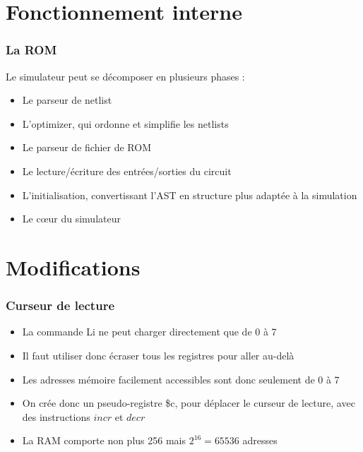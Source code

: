 \documentclass{beamer}
\begin{document}
\section{Fonctionnement interne}

\begin{frame}
\frametitle{La ROM}
Le simulateur peut se décomposer en plusieurs phases :
\begin{itemize}
	\item Le parseur de netlist
	\item L'optimizer, qui ordonne et simplifie les netlists
	\item Le parseur de fichier de ROM
	\item Le lecture/écriture des entrées/sorties du circuit
	\item L'initialisation, convertissant l'AST en structure plus adaptée à la simulation
	\item Le cœur du simulateur
\end{itemize}
\end{frame}



\section{Modifications}


\begin{frame}
\frametitle{Curseur de lecture}
\begin{itemize}
	\item La commande Li ne peut charger directement que de 0 à 7
	\item Il faut utiliser donc écraser tous les registres pour aller au-delà
	\item Les adresses mémoire facilement accessibles sont donc seulement de 0 à 7
	\item On crée donc un pseudo-registre \$c, pour déplacer le curseur de lecture, avec des instructions $incr$ et $decr$
	\item La RAM comporte non plus 256 mais $2^{16} = 65536$ adresses
\end{itemize}
\end{frame}
\end{document}
